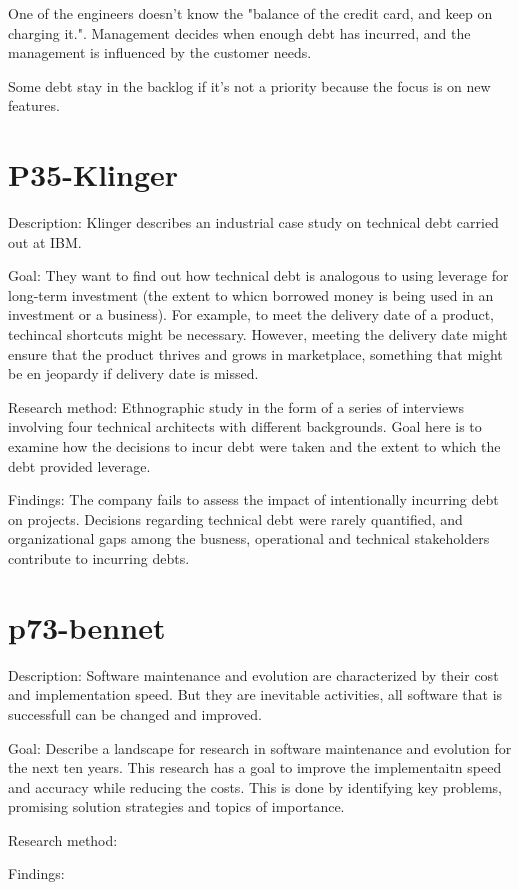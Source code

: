 One of the engineers doesn't know the "balance of the credit card, and keep on charging it.". Management decides when enough debt has incurred, and the management is influenced by the customer needs.

Some debt stay in the backlog if it's not a priority because the focus is on new features.

\section{P35-Klinger}
Description: Klinger describes an industrial case study on technical debt carried out at IBM.

Goal: They want to find out how technical debt is analogous to using leverage for long-term investment (the extent to whicn borrowed money is being used in an investment or a business). For example, to meet the delivery date of a product, techincal shortcuts might be necessary. However, meeting the delivery date might ensure that the product thrives and grows in marketplace, something that might be en jeopardy if delivery date is missed. 

Research method: Ethnographic study in the form of a series of interviews involving four technical architects with different backgrounds. Goal here is to examine how the decisions to incur debt were taken and the extent to which the debt provided leverage.

Findings: The company fails to assess the impact of intentionally incurring debt on projects. Decisions regarding technical debt were rarely quantified, and organizational gaps among the busness, operational and technical stakeholders contribute to incurring debts.




\section{p73-bennet}
Description: Software maintenance and evolution are characterized by their cost and implementation speed. But they are inevitable activities, all software that is successfull can be changed and improved.

Goal: Describe a landscape for research in software maintenance and evolution for the next ten years. This research has a goal to improve the implementaitn speed and accuracy while reducing the costs. This is done by identifying key problems, promising solution strategies and topics of importance.

Research method: 

Findings: 